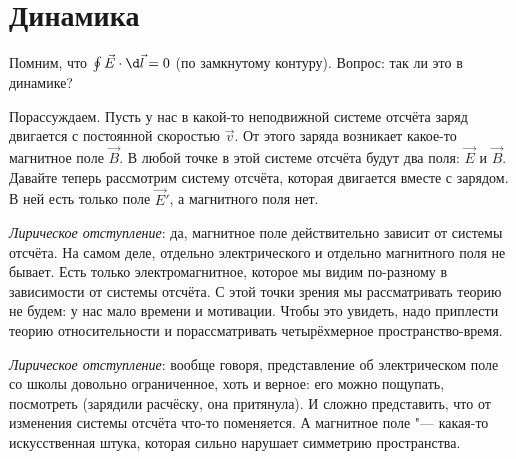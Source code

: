 
\section{Динамика}
	Помним, что $\oint \vec E \cdot \d \vec l = 0$ (по замкнутому контуру).
	Вопрос: так ли это в динамике?

	Порассуждаем.
	Пусть у нас в какой-то неподвижной системе отсчёта заряд двигается с постоянной скоростью $\vec v$.
	От этого заряда возникает какое-то магнитное поле $\vec B$.
	В любой точке в этой системе отсчёта будут два поля: $\vec E$ и $\vec B$.
	Давайте теперь рассмотрим систему отсчёта, которая двигается вместе с зарядом.
	В ней есть только поле $\vec E'$, а магнитного поля нет.
	
	\textit{Лирическое отступление}:
	да, магнитное поле действительно зависит от системы отсчёта.
	На самом деле, отдельно электрического и отдельно магнитного поля не бывает.
	Есть только электромагнитное, которое мы видим по-разному в зависимости от системы отсчёта.
	С этой точки зрения мы рассматривать теорию не будем: у нас мало времени и мотивации.
	Чтобы это увидеть, надо приплести теорию относительности и порассматривать четырёхмерное пространство-время.

	\textit{Лирическое отступление}:
	вообще говоря, представление об электрическом поле со школы довольно ограниченное, хоть
	и верное: его можно пощупать, посмотреть (зарядили расчёску, она притянула).
	И сложно представить, что от изменения системы отсчёта что-то поменяется.
	А магнитное поле "--- какая-то искусственная штука, которая сильно нарушает симметрию пространства.

